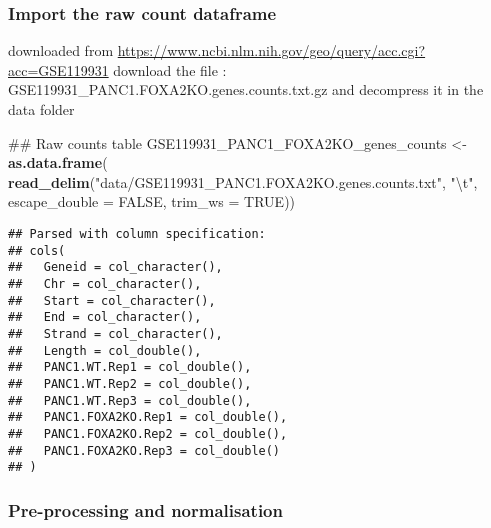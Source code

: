\documentclass[]{article}
\newenvironment{Shaded}{\begin{snugshade}}{\end{snugshade}}
\newcommand{\CharTok}[1]{\textcolor[rgb]{0.31,0.60,0.02}{#1}}
\newcommand{\DataTypeTok}[1]{\textcolor[rgb]{0.13,0.29,0.53}{#1}}
\newcommand{\DecValTok}[1]{\textcolor[rgb]{0.00,0.00,0.81}{#1}}
\newcommand{\KeywordTok}[1]{\textcolor[rgb]{0.13,0.29,0.53}{\textbf{#1}}}
\newcommand{\NormalTok}[1]{#1}
\newcommand{\OperatorTok}[1]{\textcolor[rgb]{0.81,0.36,0.00}{\textbf{#1}}}
\newcommand{\OtherTok}[1]{\textcolor[rgb]{0.56,0.35,0.01}{#1}}
\newcommand{\StringTok}[1]{\textcolor[rgb]{0.31,0.60,0.02}{#1}}
\begin{document}
\hypertarget{import-the-raw-count-dataframe}{%
\subsubsection{Import the raw count
dataframe}\label{import-the-raw-count-dataframe}}

downloaded from
\url{https://www.ncbi.nlm.nih.gov/geo/query/acc.cgi?acc=GSE119931}
download the file : GSE119931\_PANC1.FOXA2KO.genes.counts.txt.gz and
decompress it in the data folder

\begin{Shaded}
\begin{Highlighting}[]
\NormalTok{## Raw counts table}
\NormalTok{GSE119931_PANC1_FOXA2KO_genes_counts <-}\StringTok{ }\KeywordTok{as.data.frame}\NormalTok{(}
  \KeywordTok{read_delim}\NormalTok{(}\StringTok{"data/GSE119931_PANC1.FOXA2KO.genes.counts.txt"}\NormalTok{, }
                                                   \StringTok{"}\CharTok{\textbackslash{}t}\StringTok{"}\NormalTok{, }\DataTypeTok{escape_double =} \OtherTok{FALSE}\NormalTok{, }\DataTypeTok{trim_ws =} \OtherTok{TRUE}\NormalTok{)) }
\end{Highlighting}
\end{Shaded}

\begin{verbatim}
## Parsed with column specification:
## cols(
##   Geneid = col_character(),
##   Chr = col_character(),
##   Start = col_character(),
##   End = col_character(),
##   Strand = col_character(),
##   Length = col_double(),
##   PANC1.WT.Rep1 = col_double(),
##   PANC1.WT.Rep2 = col_double(),
##   PANC1.WT.Rep3 = col_double(),
##   PANC1.FOXA2KO.Rep1 = col_double(),
##   PANC1.FOXA2KO.Rep2 = col_double(),
##   PANC1.FOXA2KO.Rep3 = col_double()
## )
\end{verbatim}

\begin{Shaded}
\end{Shaded}

\hypertarget{pre-processing-and-normalisation}{%
\subsubsection{Pre-processing and
normalisation}\label{pre-processing-and-normalisation}}
\end{document}
